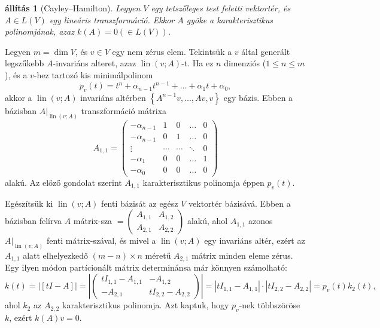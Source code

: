 \documentclass[9pt, a4paper, showtrims]{memoir}
\makeatletter
\renewenvironment{proof}[1][\proofname]
    {\par\pushQED{\qed}%
    \normalfont \topsep6\p@\@plus6\p@\relax
    \trivlist
    \item[\hskip\labelsep
        \itshape
    #1\@addpunct{:}]\ignorespaces}
    {\popQED\endtrivlist\@endpefalse}
\theoremstyle{plain}
\newtheorem{proposition}{állítás}[chapter]
\theoremstyle{remark}
\theoremstyle{definition}
\DeclareMathOperator{\lin}{lin}
\makeatother
\begin{document}
\begin{proposition}[Cayley--Hamilton]
    Legyen $V$ egy tetszőleges test feletti vektortér, 
    és $A\in L\left( V \right)$ egy lineáris transzformáció.
    Ekkor $A$ gyöke a karakterisztikus polinomjának, 
    azaz $k\left( A \right)=0
    (\in L\left( V \right))$.
\end{proposition}
\begin{proof}
    Legyen $m=\dim V$, és $v\in V$ egy nem zérus elem.
    Tekintsük a $v$ által generált legszűkebb $A$-invariáns alteret, azaz 
    $\lin\left( v;A \right)$-t.
    Ha ez $n$ dimenziós ($1\leq n\leq m$), 
    és a $v$-hez tartozó kis minimálpolinom
    \[
        p_v\left( t \right)
        =
        t^{n}+\alpha_{n-1}t^{n-1}+\dots+\alpha_1t+\alpha_0,
    \]
    akkor a
    $\lin\left( v;A \right)$ invariáns altérben
    $\left\{ A^{n-1}v,\dots,Av,v \right\}$ egy bázis.
    Ebben a bázisban $A|_{\lin\left( v;A \right)}$ transzformáció mátrixa
    \[
        A_{1,1}=
        \begin{pmatrix}
            -\alpha_{n-1}&1&0&\dots&0\\
            -\alpha_{n-1}&0&1&\dots&0\\
            \vdots&\cdots&\cdots&\ddots&0\\
            -\alpha_1&0&0&\dots&1\\
            -\alpha_0&0&0&\dots&0
        \end{pmatrix}
    \]
    alakú.
    Az előző gondolat szerint $A_{1,1}$ karakterisztikus polinomja éppen $p_v\left( t \right)$.

    Egészítsük ki $\lin\left( v;A \right)$ fenti bázisát az egész $V$ vektortér bázisává.
    Ebben a bázisban felírva $A$ mátrix-sza
    \begin{math}
        [A]=
        \begin{pmatrix}
            A_{1,1}&A_{1,2}\\
            A_{2,1}&A_{2,2}
        \end{pmatrix}
    \end{math}
    alakú, ahol $A_{1,1}$ azonos $A|_{\lin\left( v;A \right)}$ fenti mátrix-szával, és mivel a
    $\lin\left( v;A \right)$ egy invariáns altér,
    ezért az $A_{1,1}$ alatt elhelyezkedő $\left( m-n \right)\times n$ méretű $A_{2,1}$ mátrix minden eleme zérus.
    Egy ilyen módon partícionált mátrix determinánsa már könnyen számolható:
    \[
        k\left( t \right)=
        |[tI-A]|
        =
        \left|
        \begin{pmatrix}
            tI_{1,1}-A_{1,1}&-A_{1,2}\\
            -A_{2,1}&tI_{2,2}-A_{2,2}
        \end{pmatrix}
        \right|
        =
        |tI_{1,1}-A_{1,1}|\cdot|tI_{2,2}-A_{2,2}|
        =
        p_v\left( t \right)k_2\left( t \right),
    \]
    ahol $k_2$ az $A_{2,2}$ karakterisztikus polinomja.
    Azt kaptuk, hogy $p_v$-nek többszöröse $k$, 
    ezért $k\left( A \right)v=0$.
\end{proof}
\end{document}

